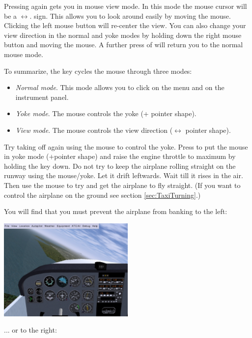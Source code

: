 Pressing  again gets you in mouse view mode. In this mode the mouse cursor will
be a $\leftrightarrow$. sign. This allows you to look around easily by moving
the mouse. Clicking the left mouse button will re-center the view.  You can also
change your view direction in the normal and yoke modes by holding down the right
mouse button and moving the mouse. A further press of  will return you to the
normal mouse mode.

To summarize, the  key cycles the mouse through three modes:
\begin{itemize}
    \item \textit{Normal mode}. This mode allows you to
  click on the menu and on the instrument panel.
    \item \textit{Yoke mode}.
  The mouse controls the yoke (+ pointer shape).
    \item \textit{View mode}. The mouse controls the
  view direction ($\leftrightarrow$ pointer shape).
\end{itemize}

Try taking off again using the mouse to control the yoke. Press  to put
the mouse in yoke mode ($+$pointer shape) and raise the engine throttle to
maximum by holding the  key down. Do not try to keep the airplane
rolling straight on the runway using the mouse/yoke. Let it drift leftwards.
Wait till it rises in the air. Then use the mouse to try and get the
airplane to fly straight. (If you want to control the airplane on the
ground see section \ref{sec:TaxiTurning}.)

You will find that you must prevent the airplane from banking to the left:

\begin{center}
\includegraphics[width=0.5\textwidth]{img/tut_11}
\end{center}

... or to the right:


